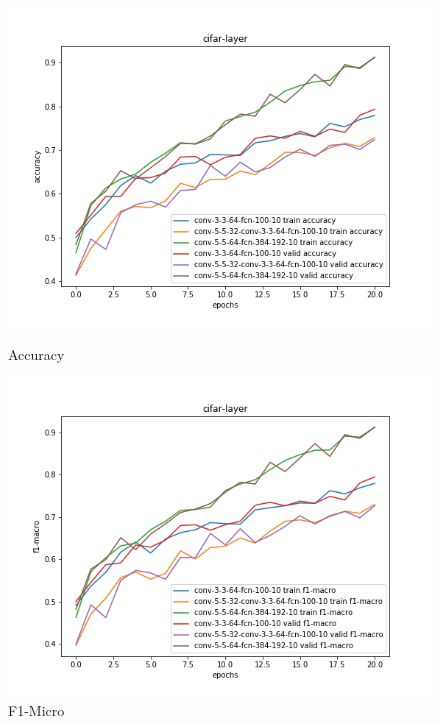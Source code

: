 \documentclass{article}
\begin{document}
\begin{figure}[!htb]
	\includegraphics[width=\linewidth]{../output_plots/CIFAR/task-1/cifar-layer-Accuracy-accuracy.png}
	\caption{Accuracy}\label{fig:part_2_task_1_accuracy}
	\endminipage\hfill
	\includegraphics[width=\linewidth]{../output_plots/CIFAR/task-1/cifar-layer-F1-macro-score-f1-macro.png}
	\caption{F1-Micro}\label{fig:part_2_task_1_f1-micro}
	\endminipage

\end{figure}
\end{document}

